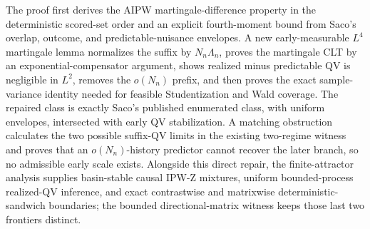 The proof first derives the AIPW martingale-difference property in the deterministic scored-set order and an explicit fourth-moment bound from Saco's overlap, outcome, and predictable-nuisance envelopes.  A new early-measurable \(L^4\) martingale lemma normalizes the suffix by \(N_n\Lambda_n\), proves the martingale CLT by an exponential-compensator argument, shows realized minus predictable QV is negligible in \(L^2\), removes the \(o(N_n)\) prefix, and then proves the exact sample-variance identity needed for feasible Studentization and Wald coverage.  The repaired class is exactly Saco's published enumerated class, with uniform envelopes, intersected with early QV stabilization.  A matching obstruction calculates the two possible suffix-QV limits in the existing two-regime witness and proves that an \(o(N_n)\)-history predictor cannot recover the later branch, so no admissible early scale exists.  Alongside this direct repair, the finite-attractor analysis supplies basin-stable causal IPW-Z mixtures, uniform bounded-process realized-QV inference, and exact contrastwise and matrixwise deterministic-sandwich boundaries; the bounded directional-matrix witness keeps those last two frontiers distinct.